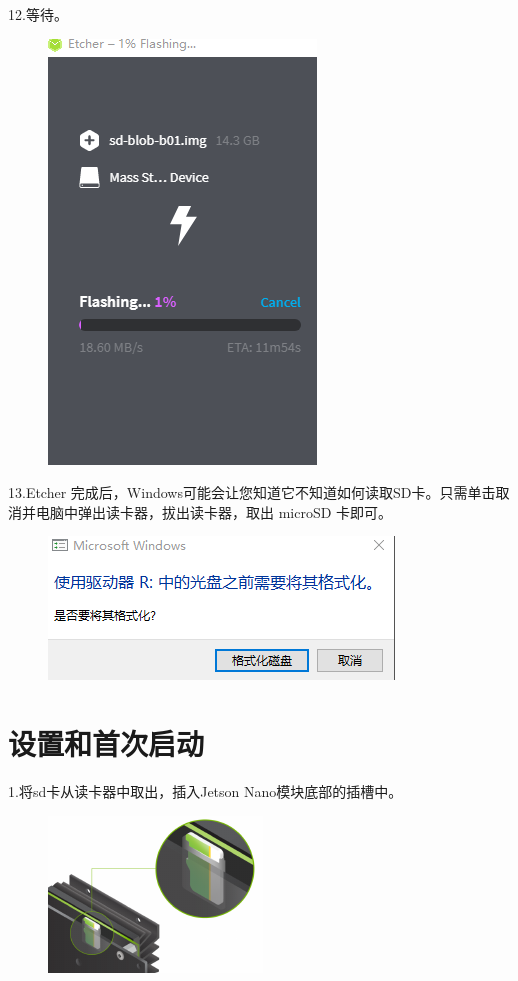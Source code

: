 \documentclass[openbib]{article}
\begin{document}
12.等待。
\begin{figure}[H]
	\centering
	\includegraphics[scale=0.4]{b11}
\end{figure}

13.Etcher 完成后，Windows可能会让您知道它不知道如何读取SD卡。只需单击取消并电脑中弹出读卡器，拔出读卡器，取出 microSD 卡即可。
\begin{figure}[H]
	\centering
	\includegraphics[scale=0.4]{b12}
\end{figure}
\section{设置和首次启动}
1.将sd卡从读卡器中取出，插入Jetson Nano模块底部的插槽中。

\begin{figure}[htbp]
	\centering
	\includegraphics[scale=0.3]{sd}
\end{figure}
\end{document}
